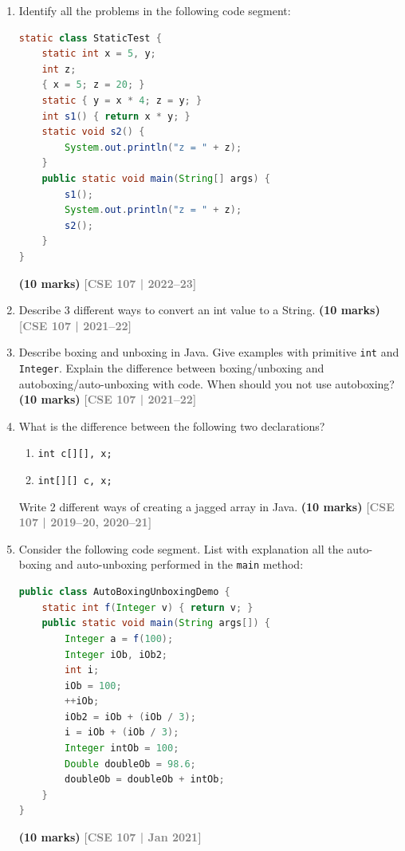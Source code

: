 \documentclass[12pt,a3paper]{article}
\newcommand{\yr}[1]{\hfill\textcolor{gray}{\small\textbf{[#1]}}}
\newcommand{\mk}[1]{\textcolor{orange!70!black}{\small\textbf{(#1 marks)}}}
\begin{document}
\begin{enumerate}



\item Identify all the problems in the following code segment:
\begin{lstlisting}[language=Java]
static class StaticTest {
    static int x = 5, y;
    int z;
    { x = 5; z = 20; }
    static { y = x * 4; z = y; }
    int s1() { return x * y; }
    static void s2() {
        System.out.println("z = " + z);
    }
    public static void main(String[] args) {
        s1();
        System.out.println("z = " + z);
        s2();
    }
}
\end{lstlisting}
\mk{10}
\yr{CSE 107 | 2022--23}




\item Describe 3 different ways to convert an int value to a String. \mk{10}
\yr{CSE 107 | 2021--22}




\item Describe boxing and unboxing in Java. Give examples with primitive \texttt{int} and \texttt{Integer}. Explain the difference between boxing/unboxing and autoboxing/auto-unboxing with code. When should you not use autoboxing? \mk{10}
\yr{CSE 107 | 2021--22}




\item What is the difference between the following two declarations?
\begin{enumerate}
  \item \texttt{int c[][], x;}
  \item \texttt{int[][] c, x;}
\end{enumerate}
Write 2 different ways of creating a jagged array in Java. \mk{10}
\yr{CSE 107 | 2019--20, 2020--21}




\item Consider the following code segment. List with explanation all the auto-boxing and auto-unboxing performed in the \texttt{main} method:
\begin{lstlisting}[language=Java]
public class AutoBoxingUnboxingDemo {
    static int f(Integer v) { return v; }
    public static void main(String args[]) {
        Integer a = f(100);
        Integer iOb, iOb2;
        int i;
        iOb = 100;
        ++iOb;
        iOb2 = iOb + (iOb / 3);
        i = iOb + (iOb / 3);
        Integer intOb = 100;
        Double doubleOb = 98.6;
        doubleOb = doubleOb + intOb;
    }
}
\end{lstlisting}
\mk{10}
\yr{CSE 107 | Jan 2021}


\end{enumerate}
\end{document}
